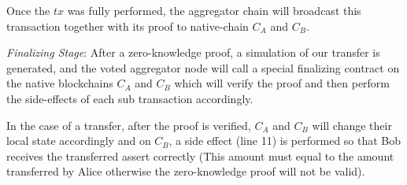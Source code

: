 Once the $tx$ was fully performed, the aggregator chain will broadcast this transaction together with its proof to native-chain $C_A$ and $C_B$.

\smallskip\noindent\emph{Finalizing Stage}:
After a zero-knowledge proof, a simulation of our transfer is generated, and the voted aggregator node will call a special finalizing contract on the native blockchains $C_A$ and $C_B$ which will verify the proof and then perform the side-effects of each sub transaction accordingly.

In the case of a transfer, after the proof is verified, $C_A$ and $C_B$ will change their local state accordingly and on $C_B$, a side effect (line 11) is performed so that Bob receives the transferred assert correctly (This amount must equal to the amount transferred by Alice otherwise the zero-knowledge proof will not be valid).





